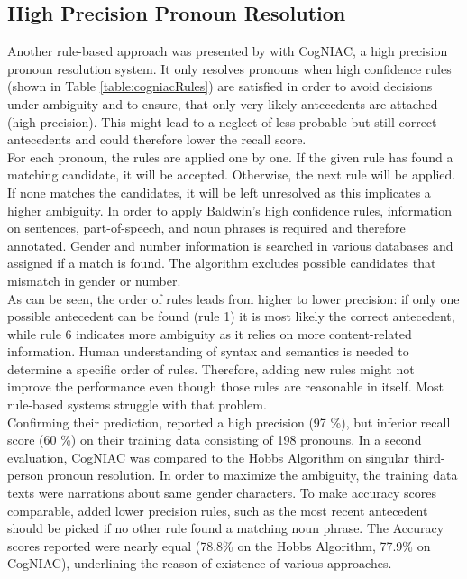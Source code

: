 \subsection{High Precision Pronoun Resolution}
\label{baldwinCogNIAC}
Another rule-based approach was presented by \citep{baldwin1997cogniac} with CogNIAC, a high precision pronoun resolution system. It only resolves pronouns when high confidence rules (shown in Table \ref{table:cogniacRules}) are satisfied in order to avoid decisions under ambiguity and to ensure, that only very likely antecedents are attached (high precision). This might lead to a neglect of less probable but still correct antecedents and could therefore lower the recall score. 
\\
For each pronoun, the rules are applied one by one. If the given rule has found a matching candidate, it will be accepted. Otherwise, the next rule will be applied. If none matches the candidates, it will be left unresolved as this implicates a higher ambiguity. In order to apply Baldwin's high confidence rules, information on sentences, part-of-speech, and noun phrases is required and therefore annotated. Gender and number information is searched in various databases and assigned if a match is found. The algorithm excludes possible candidates that mismatch in gender or number. \\
As can be seen, the order of rules leads from higher to lower precision: if only one possible antecedent can be found (rule 1) it is most likely the correct antecedent, while rule 6 indicates more ambiguity as it relies on more content-related information. Human understanding of syntax and semantics is needed to determine a specific order of rules. Therefore, adding new rules might not improve the performance even though those rules are reasonable in itself. Most rule-based systems struggle with that problem.\\
Confirming their prediction, \cite{baldwin1997cogniac} reported a high precision (97 \%), but inferior recall score (60 \%) on their training data consisting of 198 pronouns.
In a second evaluation, CogNIAC was compared to the Hobbs Algorithm \citep{baldwin1997cogniac,hobbs1978resolving} on singular third-person pronoun resolution. In order to maximize the ambiguity, the training data texts were narrations about same gender characters. To make accuracy scores comparable, \cite{baldwin1997cogniac} added lower precision rules, such as the most recent antecedent should be picked if no other rule found a matching noun phrase. The Accuracy scores reported were nearly equal (78.8\% on the Hobbs Algorithm, 77.9\% on CogNIAC), underlining the reason of existence of various approaches.

